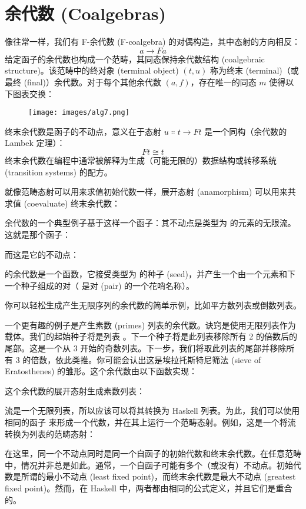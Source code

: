 \section{余代数 (Coalgebras)}

像往常一样，我们有 F-余代数 (F-coalgebra) 的对偶构造，其中态射的方向相反：
\[a \to F a\]
给定函子的余代数也构成一个范畴，其同态保持余代数结构 (coalgebraic structure)。该范畴中的终对象 (terminal object) $(t, u)$ 称为终末 (terminal)（或最终 (final)）余代数。对于每个其他余代数 $(a, f)$，存在唯一的同态 $m$ 使得以下图表交换：

\begin{figure}[H]
  \centering
  \texttt{[image: images/alg7.png]}
\end{figure}

\noindent
终末余代数是函子的不动点，意义在于态射 $u \Colon t \to F t$ 是一个同构（余代数的 Lambek 定理）：
\[F t \cong t\]
终末余代数在编程中通常被解释为生成（可能无限的）数据结构或转移系统 (transition systems) 的配方。

就像范畴态射可以用来求值初始代数一样，展开态射 (anamorphism) 可以用来共求值 (coevaluate) 终末余代数：

余代数的一个典型例子基于这样一个函子：其不动点是类型为  的元素的无限流。这就是那个函子：

而这是它的不动点：

 的余代数是一个函数，它接受类型为  的种子 (seed)，并产生一个由一个元素和下一个种子组成的对（ 是对 (pair) 的一个花哨名称）。

你可以轻松生成产生无限序列的余代数的简单示例，比如平方数列表或倒数列表。

一个更有趣的例子是产生素数 (primes) 列表的余代数。诀窍是使用无限列表作为载体。我们的起始种子将是列表 \code{{[}2..{]}}。下一个种子将是此列表移除所有 2 的倍数后的尾部。这是一个从 3 开始的奇数列表。下一步，我们将取此列表的尾部并移除所有 3 的倍数，依此类推。你可能会认出这是埃拉托斯特尼筛法 (sieve of Eratosthenes) 的雏形。这个余代数由以下函数实现：

这个余代数的展开态射生成素数列表：

流是一个无限列表，所以应该可以将其转换为 Haskell 列表。为此，我们可以使用相同的函子  来形成一个代数，并在其上运行一个范畴态射。例如，这是一个将流转换为列表的范畴态射：

在这里，同一个不动点同时是同一个自函子的初始代数和终末余代数。在任意范畴中，情况并非总是如此。通常，一个自函子可能有多个（或没有）不动点。初始代数是所谓的最小不动点 (least fixed point)，而终末余代数是最大不动点 (greatest fixed point)。然而，在 Haskell 中，两者都由相同的公式定义，并且它们是重合的。

